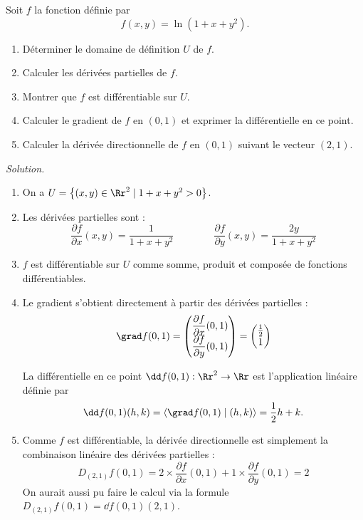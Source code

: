 \begin{exemple}{}{}
	Soit $f$ la fonction définie par 
	$$f(x,y) =  \ln(1+x+y^2).$$
	
	\begin{enumerate}
		\item Déterminer le domaine de définition $U$ de $f$.
		\item Calculer les dérivées partielles de $f$.
		\item Montrer que $f$ est différentiable sur $U$.
		\item Calculer le gradient de $f$ en $(0,1)$ et exprimer la différentielle en ce point.
		\item Calculer la dérivée directionnelle de $f$ en $(0,1)$ suivant le vecteur $(2,1)$.
	\end{enumerate}
	
	\bigskip
	\emph{Solution.}
	
	
	
	
	
	\begin{enumerate}
		\item On a $U = \big\{ (x,y) \in \Rr^2 \mid 1+x+y^2>0 \big\}$.
		
		
		\item Les dérivées partielles sont :
		$$\frac{\partial f}{\partial x}(x,y) = \frac{1}{1+x+y^2} \qquad\qquad
		\frac{\partial f}{\partial y}(x,y) = \frac{2y}{1+x+y^2}$$
		
		
		\item $f$ est différentiable sur $U$ comme somme, produit et composée de fonctions différentiables.
		
		\item Le gradient s'obtient directement à partir des dérivées partielles :
		$$\grad f (0,1) = \begin{pmatrix} \dfrac{\partial f}{\partial x}(0,1) \\\dfrac{\partial f}{\partial y}(0,1) \end{pmatrix} = 
		\begin{pmatrix} \frac12 \\ 1 \end{pmatrix}$$
		
		La différentielle en ce point $\dd f(0,1) : \Rr^2 \to \Rr$ est l'application linéaire définie par 
		$$\dd f(0,1)(h,k) = \langle \grad f (0,1) \mid (h,k) \rangle = \frac12h +k.$$
		
		\item Comme $f$ est différentiable, la dérivée directionnelle est simplement la combinaison linéaire des dérivées partielles :
		$$D_{(2,1)} f(0,1) = 2\times \frac{\partial f}{\partial x}(0,1)+1\times
		\frac{\partial f}{\partial y}(0,1) = 2$$
		On aurait aussi pu faire le calcul via la formule $D_{(2,1)} f(0,1) = \dd f(0,1)(2,1)$.
	\end{enumerate} 
	
\end{exemple}



